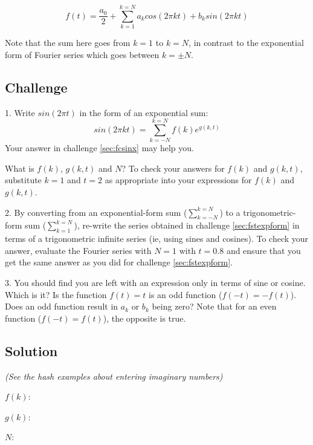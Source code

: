 \begin{equation}
    \label{eq:fsoftintrigform}
    f(t) = \frac{a_0}{2} + \sum_{k=1}^{k=N} a_k cos(2 \pi k t) + b_k sin(2 \pi k t)
\end{equation}

Note that the sum here goes from $k=1$ to $k=N$, in contrast to the exponential form of Fourier series which goes between $k=\pm N$.

\subsection*{Challenge}
1. Write $sin(2 \pi t)$ in the form of an exponential sum:
\begin{equation}
    sin(2 \pi k t)=\sum_{k=-N}^{k=N} f(k) e^{g(k,t)}
\end{equation}
Your answer in challenge \ref{sec:fcsinx} may help you.

What is $f(k)$, $g(k,t)$ and $N$? To check your answers for $f(k)$ and $g(k,t)$, substitute $k=1$ and $t=2$ as appropriate into your expressions for $f(k)$ and $g(k,t)$.

2. By converting from an exponential-form sum ($\sum_{k=-N}^{k=N}$) to a trigonometric-form sum ($\sum_{k=1}^{k=N}$), re-write the series obtained in challenge \ref{sec:fstexpform} in terms of a trigonometric infinite series (ie, using sines and cosines). To check your answer, evaluate the Fourier series with $N=1$ with $t=0.8$ and ensure that you get the same answer as you did for challenge \ref{sec:fstexpform}.

3. You should find you are left with an expression only in terms of sine or cosine. Which is it? Is the function $f(t)=t$ is an odd function ($f(-t)=-f(t)$). Does an odd function result in $a_k$ or $b_k$ being zero? Note that for an even function ($f(-t)=f(t)$), the opposite is true.

\subsection*{Solution}
\emph{(See the hash examples about entering imaginary numbers)}

$f(k)$: 

$g(k)$: 

$N$: 




